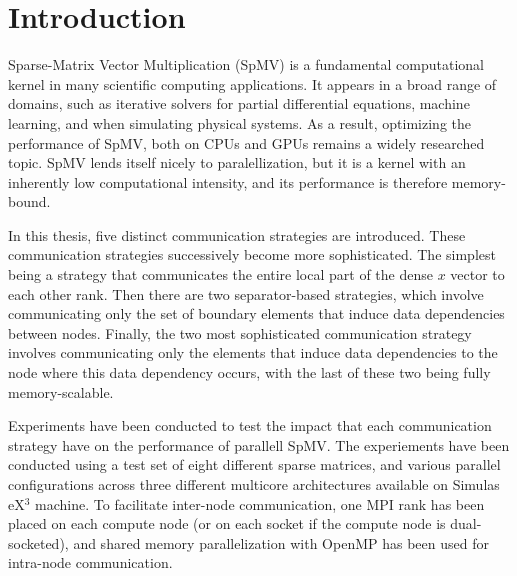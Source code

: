\chapter{Introduction}
Sparse-Matrix Vector Multiplication (SpMV) is a fundamental computational kernel in many scientific computing applications. It appears in a broad range of domains, such as iterative solvers for partial differential equations, machine learning, and when simulating physical systems. As a result, optimizing the performance of SpMV, both on CPUs and GPUs remains a widely researched topic. SpMV lends itself nicely to paralellization, but it is a kernel with an inherently low computational intensity, and its performance is therefore memory-bound.
\medskip

In this thesis, five distinct communication strategies are introduced. These communication strategies successively become more sophisticated. The simplest being a strategy that communicates the entire local part of the dense \(x\) vector to each other rank. Then there are two separator-based strategies, which involve communicating only the set of boundary elements that induce data dependencies between nodes. Finally, the two most sophisticated communication strategy involves communicating only the elements that induce data dependencies to the node where this data dependency occurs, with the last of these two being fully memory-scalable.
\medskip

Experiments have been conducted to test the impact that each communication strategy have on the performance of parallell SpMV. The experiements have been conducted using a test set of eight different sparse matrices, and various parallel configurations across three different multicore architectures available on Simulas eX\(^{3}\) machine. To facilitate inter-node communication, one MPI rank has been placed on each compute node (or on each socket if the compute node is dual-socketed), and shared memory parallelization with OpenMP has been used for intra-node communication.
\medskip
